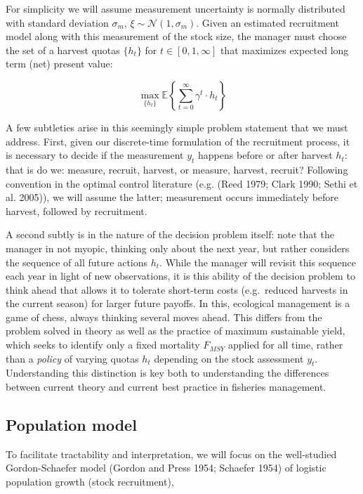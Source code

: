 \documentclass[3p]{elsarticle} %
\begin{document}
For simplicity we will assume measurement uncertainty is normally
distributed with standard deviation \(\sigma_m\),
\(\xi \sim \mathcal{N}(1, \sigma_m)\). Given an estimated recruitment
model along with this measurement of the stock size, the manager must
choose the set of a harvest quotas \(\lbrace h_t \rbrace\) for
\(t \in [0, 1, \infty]\) that maximizes expected long term (net) present
value:

\begin{equation}
\max_{ \lbrace h_t \rbrace } \mathbb{E} \left \{ \sum_{t=0}^{\infty} \gamma^t \cdot h_t \right \}
\end{equation}

A few subtleties arise in this seemingly simple problem statement that
we must address. First, given our discrete-time formulation of the
recruitment process, it is necessary to decide if the measurement
\(y_t\) happens before or after harvest \(h_t\): that is do we: measure,
recruit, harvest, or measure, harvest, recruit? Following convention in
the optimal control literature (e.g. (Reed 1979; Clark 1990; Sethi et
al. 2005)), we will assume the latter; measurement occurs immediately
before harvest, followed by recruitment.

A second subtly is in the nature of the decision problem itself: note
that the manager in not myopic, thinking only about the next year, but
rather considers the sequence of all future actions \({h_t}\). While the
manager will revisit this sequence each year in light of new
observations, it is this ability of the decision problem to think ahead
that allows it to tolerate short-term costs (e.g.~reduced harvests in
the current season) for larger future payoffs. In this, ecological
management is a game of chess, always thinking several moves ahead. This
differs from the problem solved in theory as well as the practice of
maximum sustainable yield, which seeks to identify only a fixed
mortality \(F_{MSY}\) applied for all time, rather than a \emph{policy}
of varying quotas \(h_t\) depending on the stock assessment \(y_t\).
Understanding this distinction is key both to understanding the
differences between current theory and current best practice in
fisheries management.

\hypertarget{population-model}{%
\subsection{Population model}\label{population-model}}

To facilitate tractability and interpretation, we will focus on the
well-studied Gordon-Schaefer model (Gordon and Press 1954; Schaefer
1954) of logistic population growth (stock recruitment),
\end{document}
